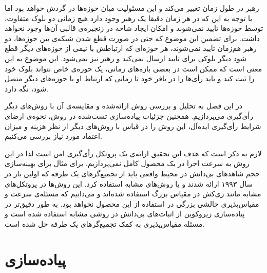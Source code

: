 \par 
رهبر در طول زمان تغییر می‌کند و این مسئولیت میان حوزه‌ها در گردش خواهد بود اما با توجه  به این که در هر زمان دقیقا یک رهبر وجود دارد هیچ زمانی دو بلوک متفاوت، توسط حوزه‌ها تایید نمی‌شوند و امکان ایجاد شاخه در زنجیره‌ی قالبی آن‌ها وجود نخواهد داشت. برای تضمین این موضوع که حتی در صورت قطع شدن شبکه‌ی بین حوزه‌ها، دو رهبر هم‌زمان تایید نمی‌شوند، هر حوزه‌ای که ارتباطش با نیمی از حوزه‌های دیگر قطع شود دیگر بلوکی برای تایید ارسال نمی‌کند و رهبر نیز نمی‌شود. این موضوع به این معنی است که ممکن است در بعضی بازه‌های زمانی، یک حوزه‌ی خاص نتواند بلوک خود را ثبت کند و باید رأی‌ها را در بافر خود تا زمانی که ارتباط او با حوزه‌های دیگر متصل شود، نگه‌ دارد.

در این فصل به تحلیل و بررسی روش ارائه‌شده و مقایسه‌ی آن با روش‌های دیگر رأی‌گیری می‌پردازیم. همچنین جزئیات پیاده‌سازی تست‌شده در روش، نحوه‌ی ارضای شرایط رأی‌گیری ایده‌آل، این روش را در قیاس با روش‌های دیگر از نظر هزینه و میزان اعتماد مورد نیاز بررسی می‌کنیم. 
\par
لازم به ذکر است که هدف این تحقیق ارائه‌ی یک پروتکل رأی‌گیری امن است لذا در این روش به سرعت اجرا در یک محصول کامل نمی‌پردازیم. برای مثال برای بهینه‌سازی حجم شاهد‌های بی‌دانش در محیط واقعی باید از تجمیع‌گر‌های یک طرفه 
که اولین بار در سال ۱۹۹۳ 
\cite{oneway}
ارائه شدند و یا روش‌های مشابه استفاده کرد. این روش‌ها در پروتکل‌های مشابه مانند زی‌کش در مقیاس بزرگ استفاده‌ شده‌اند و می‌دانیم که مسئله‌ی سرعت و مقیاس‌پذیری چالشی بزرگی در استفاده از این محصول نخواهد بود. به طور دقیق‌تر در پیاده‌سازی زیروکوین 
\cite{zerocoin}
از اثبات‌های بی‌دانش در روشی مشابه استفاده شده است و مسئله مقیاس‌پذیری به کمک تجمیع‌گرهای یک‌ طرفه حل شده است. 


\section{پیاده‌سازی}


